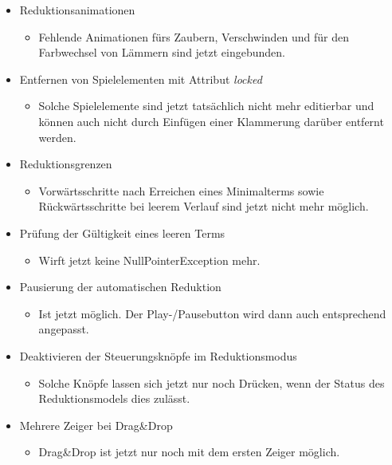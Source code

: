 \begin{itemize}
\item Reduktionsanimationen
\begin{itemize} 
\item Fehlende Animationen fürs Zaubern, Verschwinden und für den Farbwechsel von Lämmern sind jetzt eingebunden.
	\end{itemize}
\end{itemize}

\begin{itemize}
\item Entfernen von Spielelementen mit Attribut \textit{locked}
\begin{itemize} 
\item Solche Spielelemente sind jetzt tatsächlich nicht mehr editierbar und können auch nicht durch Einfügen einer Klammerung darüber entfernt werden.
	\end{itemize}
\end{itemize}

\begin{itemize}
\item Reduktionsgrenzen
\begin{itemize} 
\item Vorwärtsschritte nach Erreichen eines Minimalterms sowie Rückwärtsschritte bei leerem Verlauf sind jetzt nicht mehr möglich.
	\end{itemize}
\end{itemize}

\begin{itemize}
\item Prüfung der Gültigkeit eines leeren Terms
\begin{itemize} 
\item Wirft jetzt keine NullPointerException mehr.
	\end{itemize}
\end{itemize}

\begin{itemize}
\item Pausierung der automatischen Reduktion
\begin{itemize} 
\item Ist jetzt möglich. Der Play-/Pausebutton wird dann auch entsprechend angepasst.
	\end{itemize}
\end{itemize}

\begin{itemize}
\item Deaktivieren der Steuerungsknöpfe im Reduktionsmodus
\begin{itemize} 
\item Solche Knöpfe lassen sich jetzt nur noch Drücken, wenn der Status des Reduktionsmodels dies zulässt.
	\end{itemize}
\end{itemize}

\begin{itemize}
\item Mehrere Zeiger bei Drag\&Drop
\begin{itemize} 
\item Drag\&Drop ist jetzt nur noch mit dem ersten Zeiger möglich.
	\end{itemize}
\end{itemize}